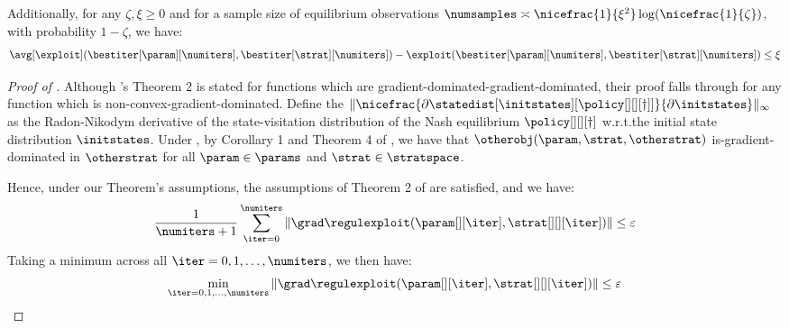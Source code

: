 \begin{reptheorem}[\ref{thm:apprenticeship_thm}]
     Additionally, for any $\zeta, \xi \geq 0$ and for a sample size of equilibrium observations $\numsamples \asymp \nicefrac{1}{\xi^2} \log(\nicefrac{1}{\zeta})$, with probability $1-\zeta$, we have:
        \begin{align}
            \avg[{\exploit}] (\bestiter[{\param}][\numiters], \bestiter[{\strat}][\numiters]) - \exploit(\bestiter[{\param}][\numiters], \bestiter[{\strat}][\numiters]) \leq \xi
        \end{align}
\end{reptheorem}

\begin{proof}[Proof of ]
    Although \cite{daskalakis2020independent}'s Theorem 2 is stated for functions which are gradient-dominated-gradient-dominated, their proof falls through for any function which is non-convex-gradient-dominated. Define  the  $\|\nicefrac{\partial\statedist[\initstates][{\policy[][][\dagger]}]}{\partial \initstates} \|_\infty$ as the Radon-Nikodym derivative of the state-visitation distribution of the Nash equilibrium $\policy[][][\dagger]$ w.r.t.\@ the initial state distribution $\initstates$.
    Under , by Corollary 1 and Theorem 4 of \citet{bhandari2019global}, we have that $\otherobj(\param, \strat, \otherstrat)$ is-gradient-dominated in $\otherstrat$ for all $\param \in \params$ and $\strat \in \stratspace$.

    
        Hence, under our Theorem's assumptions, the assumptions of Theorem 2 of \citet{daskalakis2020independent} are satisfied, and we have:
    \begin{align}
        \frac{1}{\numiters + 1} \sum_{\iter = 0}^\numiters \left\|\grad \regulexploit(\param[][\iter], \strat[][][\iter]) \right\| \leq \varepsilon
    \end{align}
% 
% 
Taking a minimum across all $\iter = 0, 1, \hdots, \numiters$, we then have:
% 
    \begin{align}
          \min_{\iter = 0, 1, \hdots, \numiters} \left\|\grad \regulexploit(\param[][\iter], \strat[][][\iter]) \right\| \leq \varepsilon
    \end{align}
    

\end{proof}
